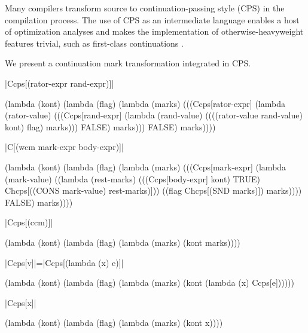 \documentclass{llncs}
\begin{document}
Many compilers transform source to continuation-passing style (CPS) in the compilation process. The use of CPS as an intermediate language enables a host of optimization analyses and makes the implementation of otherwise-heavyweight features trivial, such as first-class continuations \cite{appel2007compiling}.

We present a continuation mark transformation integrated in CPS.

\begin{schemedefn}{\scheme|Ccps[(rator-expr rand-expr)]|}
\begin{schemedisplay}
(lambda (kont)
   (lambda (flag)
     (lambda (marks)
       (((Ccps[rator-expr]
          (lambda (rator-value)
            (((Ccps[rand-expr]
               (lambda (rand-value)
                 ((((rator-value rand-value) kont) flag) marks)))
              FALSE)
             marks)))
         FALSE)
        marks))))
\end{schemedisplay}
\end{schemedefn}

\begin{schemedefn}{\scheme|C[(wcm mark-expr body-expr)]|}
\begin{schemedisplay}
(lambda (kont)
  (lambda (flag)
    (lambda (marks)
      (((Ccps[mark-expr]
          (lambda (mark-value) 
            ((lambda (rest-marks) 
               (((Ccps[body-expr] kont) TRUE) Chcps[((CONS mark-value) rest-marks)]))
             ((flag Chcps[(SND marks)]) marks))))
        FALSE)
       marks))))
\end{schemedisplay}
\end{schemedefn}

\begin{schemedefn}{\scheme|Ccps[(ccm)]|}
\begin{schemedisplay}
(lambda (kont)
  (lambda (flag)
    (lambda (marks)
      (kont marks))))
\end{schemedisplay}
\end{schemedefn}

\noindent
\begin{minipage}{0.5\linewidth}
\begin{schemedefn}{\scheme|Ccps[v]|=\scheme|Ccps[(lambda (x) e)]|}
\begin{schemedisplay}
(lambda (kont)
  (lambda (flag)
    (lambda (marks)
      (kont (lambda (x) Ccps[e])))))
\end{schemedisplay}
\end{schemedefn}
\end{minipage}
\begin{minipage}{0.5\linewidth}
\begin{schemedefn}{\scheme|Ccps[x]|}
\begin{schemedisplay}
(lambda (kont)
  (lambda (flag)
    (lambda (marks)
      (kont x))))
\end{schemedisplay}
\end{schemedefn}
\end{minipage}
\\
\\
\end{document}
